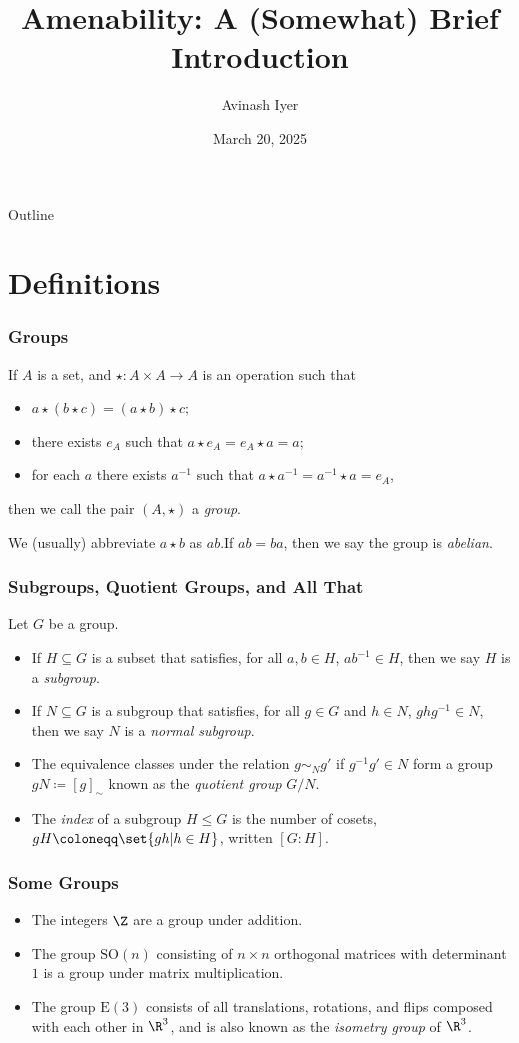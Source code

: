 \documentclass{beamer-custom}
\title{Amenability: A (Somewhat) Brief Introduction}
\author{Avinash Iyer}
\institute{Occidental College}
\date{March 20, 2025}
\begin{document}
\begin{frame}
    \titlepage
\end{frame}

\begin{frame}{Outline}
    \tableofcontents
\end{frame}
\section{Definitions}%
\begin{frame}
  \frametitle{Groups}
  If $A$ is a set, and $\star\colon A\times A \rightarrow A$ is an operation such that
  \begin{itemize}
    \item $a\star\left(b\star c\right) = \left(a\star b\right)\star c$;\pause
    \item there exists $e_A$ such that $a\star e_A = e_A\star a = a$;\pause
    \item for each $a$ there exists $a^{-1}$ such that $a\star a^{-1} = a^{-1}\star a = e_A$,\pause
  \end{itemize}
  then we call the pair $\left(A,\star\right)$ a \textit{group}.\pause\hfill\break

  We (usually) abbreviate $a\star b$ as $ab$.\pause\:If $ab = ba$, then we say the group is \textit{abelian}.
\end{frame}
\begin{frame}
  \frametitle{Subgroups, Quotient Groups, and All That}
  Let $G$ be a group.
  \begin{itemize}
    \item If $H\subseteq G$ is a subset that satisfies, for all $a,b\in H$, $ab^{-1}\in H$, then we say $H$ is a \textit{subgroup}.\pause
    \item If $N\subseteq G$ is a subgroup that satisfies, for all $g\in G$ and $h\in N$, $ghg^{-1}\in N$, then we say $N$ is a \textit{normal subgroup}.\pause
    \item The equivalence classes under the relation $g\sim_{N} g'$ if $g^{-1}g' \in N$ form a group $gN\coloneqq \left[ g \right]_{\sim}$ known as the \textit{quotient group} $G/N$.\pause
    \item The \textit{index} of a subgroup $H\leq G$ is the number of cosets, $gH\coloneqq \set{gh | h\in H}$, written $\left[ G:H \right]$.
  \end{itemize}
\end{frame}
\begin{frame}
  \frametitle{Some Groups}
  \begin{itemize}
    \item The integers $\Z$ are a group under addition.\pause
    \item The group $\text{SO}(n)$ consisting of $n\times n$ orthogonal matrices with determinant $1$ is a group under matrix multiplication.\pause
    \item The group $\text{E}\left( 3 \right)$ consists of all translations, rotations, and flips composed with each other in $\R^3$, and is also known as the \textit{isometry group} of $\R^3$.
  \end{itemize}
\end{frame}
\end{document}
